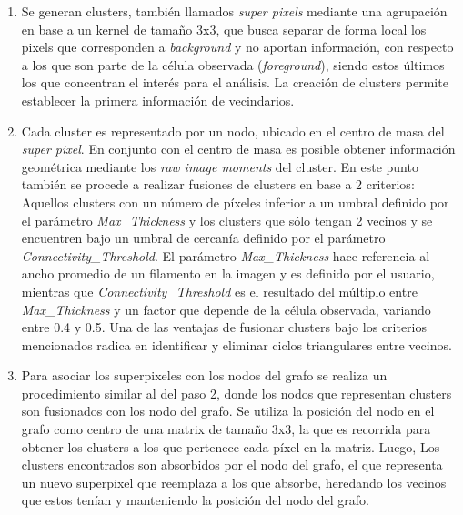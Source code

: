 \begin{enumerate}
    \item Se generan clusters, tambi\'en llamados {\it super pixels} mediante una agrupaci\'on en base a un kernel de tama\~no 3x3, que busca separar de forma local los pixels que corresponden a {\it background} y no aportan informaci\'on, con respecto a los que son parte de la c\'elula observada ({\it foreground}), siendo estos \'ultimos los que concentran el inter\'es para el an\'alisis. La creaci\'on de clusters permite establecer la primera informaci\'on de vecindarios.
    
    \item Cada cluster es representado por un nodo, ubicado en el centro de masa del {\it super pixel}. En conjunto con el centro de masa es posible obtener informaci\'on geom\'etrica mediante los {\it raw image moments}\cite{chaumette2004image} del cluster. En este punto tambi\'en se procede a realizar fusiones de clusters en base a 2 criterios: Aquellos clusters con un n\'umero de p\'ixeles inferior a un umbral definido por el par\'ametro {\it Max\_Thickness} y los clusters que s\'olo tengan 2 vecinos y se encuentren bajo un umbral de cercan\'ia definido por el par\'ametro {\it Connectivity\_Threshold}. El par\'ametro {\it Max\_Thickness} hace referencia al ancho promedio de un filamento en la imagen y es definido por el usuario, mientras que {\it Connectivity\_Threshold} es el resultado del m\'ultiplo entre {\it Max\_Thickness} y un factor que depende de la c\'elula observada, variando entre 0.4 y 0.5. Una de las ventajas de fusionar clusters bajo los criterios mencionados radica en identificar y eliminar ciclos triangulares entre vecinos.%
    
    \item Para asociar los superpixeles con los nodos del grafo se realiza un procedimiento similar al del paso 2, donde los nodos que representan clusters son fusionados con los nodo del grafo. Se utiliza la posici\'on del nodo en el grafo como centro de una matrix de tama\~no 3x3, la que es recorrida para obtener los clusters a los que pertenece cada p\'ixel en la matriz. Luego, Los clusters encontrados son absorbidos por el nodo del grafo, el que representa un nuevo superpixel que reemplaza a los que absorbe, heredando los vecinos que estos ten\'ian y manteniendo la posici\'on del nodo del grafo.
    
\end{enumerate}


